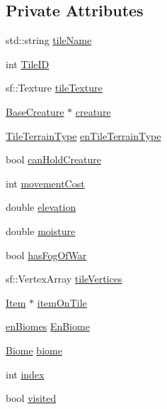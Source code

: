 \subsection*{Private Attributes}
\begin{DoxyCompactItemize}
\item 
std\+::string \mbox{\hyperlink{class_tile_a9077011a35b8d48635b4d0f1dd0d4301}{tile\+Name}}
\item 
int \mbox{\hyperlink{class_tile_a5ec79bc852b40288b33e811bdba5ab57}{Tile\+ID}}
\item 
sf\+::\+Texture \mbox{\hyperlink{class_tile_aadc3f94708663a43fd9e31527403699e}{tile\+Texture}}
\item 
\mbox{\hyperlink{class_base_creature}{Base\+Creature}} $\ast$ \mbox{\hyperlink{class_tile_a76a5a669ad1cc613baf897043e334513}{creature}}
\item 
\mbox{\hyperlink{_enum_types_8hpp_a462b3f8c270b48544fc9c2e167a3f6e5}{Tile\+Terrain\+Type}} \mbox{\hyperlink{class_tile_a65a491c9f71f9644bcf85ae566bf0ab1}{en\+Tile\+Terrain\+Type}}
\item 
bool \mbox{\hyperlink{class_tile_acacf4fe2349698e47f060d5301f7ba93}{can\+Hold\+Creature}}
\item 
int \mbox{\hyperlink{class_tile_a7355117c68359a9872776e2df0df915a}{movement\+Cost}}
\item 
double \mbox{\hyperlink{class_tile_ac49c835023fc67319d2b374d7ea292c7}{elevation}}
\item 
double \mbox{\hyperlink{class_tile_aa4b6e72b36f15fa745df02e32259270f}{moisture}}
\item 
bool \mbox{\hyperlink{class_tile_a16cec834065e19860ae027d0a64ba4c5}{has\+Fog\+Of\+War}}
\item 
sf\+::\+Vertex\+Array \mbox{\hyperlink{class_tile_a7207a99631a32c770faba9463afb14f3}{tile\+Vertices}}
\item 
\mbox{\hyperlink{class_item}{Item}} $\ast$ \mbox{\hyperlink{class_tile_aeaade478f3e36be75cf8de09d0ffda8e}{item\+On\+Tile}}
\item 
\mbox{\hyperlink{_enum_types_8hpp_a5c2255009cd01c90cf68245e6f453d1c}{en\+Biomes}} \mbox{\hyperlink{class_tile_a27444551bff65c2eefc3754a67d61c31}{En\+Biome}}
\item 
\mbox{\hyperlink{class_biome}{Biome}} \mbox{\hyperlink{class_tile_aaaecf4c66080aa56274a50e6a1e3507f}{biome}}
\item 
int \mbox{\hyperlink{class_tile_a0df7b6e81047e9932b02a45531e1f175}{index}}
\item 
bool \mbox{\hyperlink{class_tile_a6fc86234519f692394d5c3214a220a0f}{visited}}
\end{DoxyCompactItemize}


